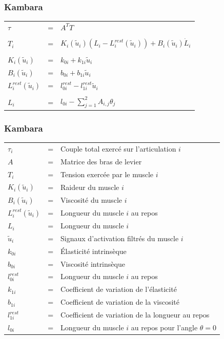 \documentclass{beamer}
\begin{document}
\begin{frame}
\frametitle{Kambara}
\begin{tabular}{lcl}
    $\tau$ & = & $A^T T$ \\
    & & \\
    $T_i$                     & = & $K_i(\tilde{u}_i) (L_i - L_i^{rest}(\tilde{u}_i)) + B_i(\tilde{u}_i) \dot{L}_i$ \\
    & & \\
    $K_i(\tilde{u}_i)$        & = & $k_{0i} + k_{1i} \tilde{u}_i$ \\
    $B_i(\tilde{u}_i)$        & = & $b_{0i} + b_{1i} \tilde{u}_i$ \\
    $L_i^{rest}(\tilde{u}_i)$ & = & $ l_{0i}^{rest} - l_{1i}^{rest} \tilde{u}_i$ \\
    & & \\
    $L_i$ & = & $l_{0i} - \sum_{j=1}^2 A_{i,j} \theta_j $ \\
\end{tabular}
\end{frame}

\begin{frame}
\frametitle{Kambara}
\begin{tabular}{lcl}
    $\tau_i$ & = & Couple total exercé sur l'articulation $i$ \\
    $A$  & = & Matrice des bras de levier \\
    $T_i$  & = & Tension exercée par le muscle $i$ \\
    $K_i(\tilde{u}_i)$ & = & Raideur du muscle $i$ \\
    $B_i(\tilde{u}_i)$ & = & Viscosité du muscle $i$ \\
    $L_i^{rest}(\tilde{u}_i)$ & = & Longueur du muscle $i$ au repos \\
    $L_i$ & = & Longueur du muscle $i$ \\
    $\tilde{u}_i$ & = & Signaux d'activation filtrés du muscle $i$ \\
    $k_{0i}$ & = & Élasticité intrinsèque \\
    $b_{0i}$ & = & Viscosité intrinsèque \\
    $l^{rest}_{0i}$ & = & Longueur du muscle $i$ au repos \\
    $k_{1i}$ & = & Coefficient de variation de l'élasticité \\
    $b_{1i}$ & = & Coefficient de variation de la viscosité \\
    $l^{rest}_{1i}$ & = & Coefficient de variation de la longueur au repos \\
    $l_{0i}$ & = & Longueur du muscle $i$ au repos pour l'angle $\theta = 0$ \\
\end{tabular}
\end{frame}
\end{document}
